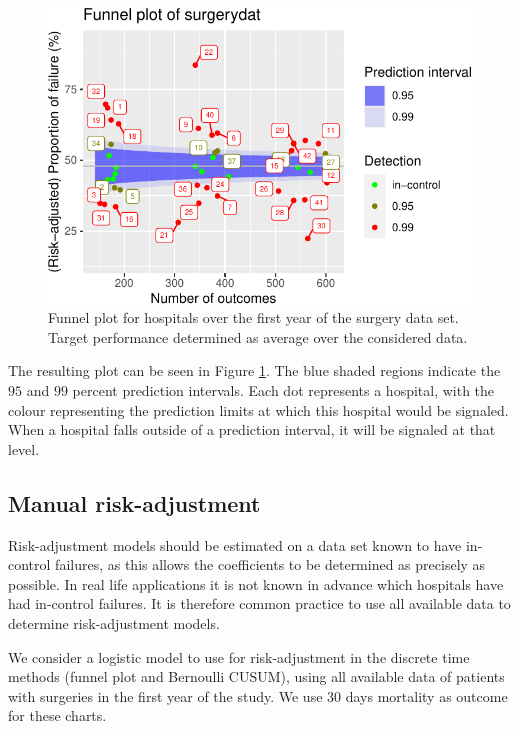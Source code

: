 \begin{figure}
\centering
\includegraphics{RJ-2023-095_files/figure-latex/assisted-funnel-1.pdf}
\caption{\label{fig:assisted-funnel}Funnel plot for hospitals over the first year of the surgery data set. Target performance determined as average over the considered data.}
\end{figure}

The resulting plot can be seen in Figure \ref{fig:assisted-funnel}. The blue shaded regions indicate the \(95\) and \(99\) percent prediction intervals. Each dot represents a hospital, with the colour representing the prediction limits at which this hospital would be signaled. When a hospital falls outside of a prediction interval, it will be signaled at that level.

\hypertarget{sec:ManualRiskAdjustment}{%
\subsection{Manual risk-adjustment}\label{sec:ManualRiskAdjustment}}

Risk-adjustment models should be estimated on a data set known to have in-control failures, as this allows the coefficients to be determined as precisely as possible. In real life applications it is not known in advance which hospitals have had in-control failures. It is therefore common practice to use all available data to determine risk-adjustment models.

We consider a logistic model to use for risk-adjustment in the discrete time methods (funnel plot and Bernoulli CUSUM), using all available data of patients with surgeries in the first year of the study. We use 30 days mortality as outcome for these charts.

